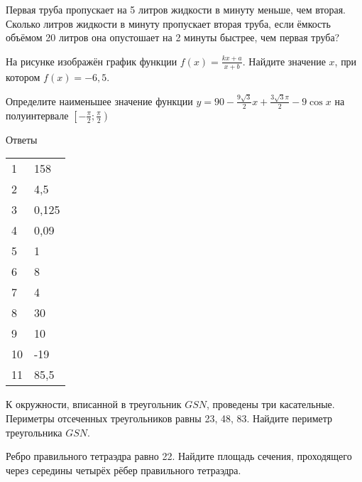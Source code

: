 \begin{taskBN}{9}
Первая труба пропускает на 5 литров жидкости в минуту меньше, чем вторая. Сколько литров жидкости в минуту пропускает вторая труба, если ёмкость объёмом 20 литров она опустошает на 2 минуты быстрее, чем первая труба?

\end{taskBN}

\begin{taskBN}{10}
На рисунке изображён график функции $f(x)=\frac{kx+a}{x+b}$. Найдите значение $x$, при котором $f(x)=-6{,}5$.
\end{taskBN}

\begin{taskBN}{11}
Определите наименьшее значение функции $y =90-\frac{9\sqrt{3}}{2}x+\frac{3\sqrt{3}\pi}{2}-9\cos x$ на полуинтервале $\left[-\frac{\pi}{2};\frac{\pi}{2} \right)$
\end{taskBN}
\newpage Ответы

\begin{table}\begin{tabular}{ll}
   1 & 158\\2 & 4,5\\3 & 0,125\\4 & 0,09\\5 & 1\\6 & 8\\7 & 4\\8 & 30\\9 & 10\\10 & -19\\11 & 85,5\\
\end{tabular}\end{table}

\cleardoublepage

\def\examvart{Вариант 13.2}

\normalsize



\startpartone\large

\begin{taskBN}{1}
К окружности, вписанной в треугольник $GSN$, проведены три касательные. Периметры отсеченных треугольников равны 23, 48, 83. Найдите периметр треугольника $GSN$.
\end{taskBN}

\begin{taskBN}{2}
Ребро правильного тетраэдра равно 22. Найдите площадь сечения, проходящего через середины четырёх рёбер правильного тетраэдра.
\end{taskBN}

